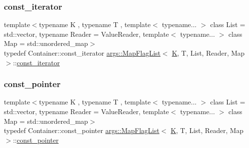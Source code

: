 \mbox{\label{classargs_1_1_map_flag_list_a6b59eb2e45bf0e576d01b902f3c7a0d7}} 
\subsubsection{\texorpdfstring{const\+\_\+iterator}{const\_iterator}}
{\footnotesize\ttfamily template$<$typename K , typename T , template$<$ typename... $>$ class List = std\+::vector, typename Reader  = Value\+Reader, template$<$ typename... $>$ class Map = std\+::unordered\+\_\+map$>$ \\
typedef Container\+::const\+\_\+iterator \hyperlink{classargs_1_1_map_flag_list}{args\+::\+Map\+Flag\+List}$<$ \hyperlink{cgal__test_8cpp_a891e241aa245ae63618f03737efba309}{K}, T, List, Reader, Map $>$\+::\hyperlink{classargs_1_1_map_flag_list_a6b59eb2e45bf0e576d01b902f3c7a0d7}{const\+\_\+iterator}}

\mbox{\label{classargs_1_1_map_flag_list_a7dff9e884a42029fc9f5bd0fcbfb12c3}} 
\subsubsection{\texorpdfstring{const\+\_\+pointer}{const\_pointer}}
{\footnotesize\ttfamily template$<$typename K , typename T , template$<$ typename... $>$ class List = std\+::vector, typename Reader  = Value\+Reader, template$<$ typename... $>$ class Map = std\+::unordered\+\_\+map$>$ \\
typedef Container\+::const\+\_\+pointer \hyperlink{classargs_1_1_map_flag_list}{args\+::\+Map\+Flag\+List}$<$ \hyperlink{cgal__test_8cpp_a891e241aa245ae63618f03737efba309}{K}, T, List, Reader, Map $>$\+::\hyperlink{classargs_1_1_map_flag_list_a7dff9e884a42029fc9f5bd0fcbfb12c3}{const\+\_\+pointer}}

\mbox{\label{classargs_1_1_map_flag_list_a68a39fcca6b7b4937d1a04c21b9749e5}} 
